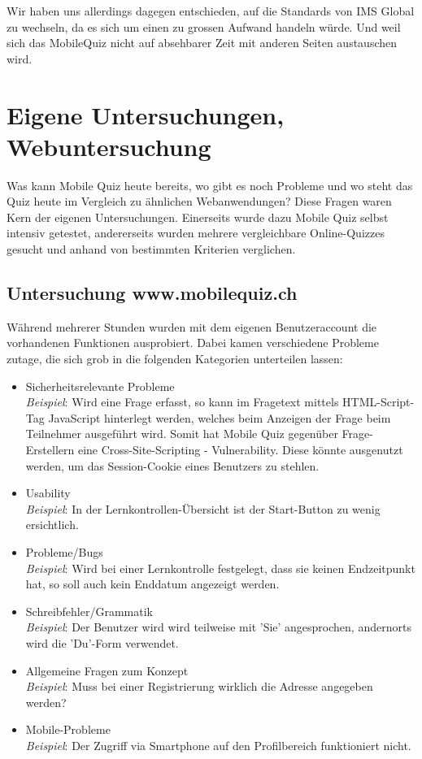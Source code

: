 Wir haben uns allerdings dagegen entschieden, auf die Standards von IMS Global zu wechseln, da es sich um einen zu grossen Aufwand handeln würde. Und weil sich das MobileQuiz nicht auf absehbarer Zeit mit anderen Seiten austauschen wird.


\section{Eigene Untersuchungen, Webuntersuchung}

Was kann Mobile Quiz heute bereits, wo gibt es noch Probleme und wo steht das Quiz heute im Vergleich zu ähnlichen Webanwendungen? Diese Fragen waren Kern der eigenen Untersuchungen. Einerseits wurde dazu Mobile Quiz selbst intensiv getestet, andererseits wurden mehrere vergleichbare Online-Quizzes gesucht und anhand von bestimmten Kriterien verglichen.


	\subsection{Untersuchung www.mobilequiz.ch}
	Während mehrerer Stunden wurden mit dem eigenen Benutzeraccount die vorhandenen Funktionen ausprobiert. Dabei kamen verschiedene Probleme zutage, die sich grob in die folgenden Kategorien unterteilen lassen:
	
	
	\begin{itemize}
		\item Sicherheitsrelevante Probleme \\
		\textit{Beispiel}: Wird eine Frage erfasst, so kann im Fragetext mittels HTML-Script-Tag JavaScript hinterlegt werden, welches beim Anzeigen der Frage beim Teilnehmer ausgeführt wird. Somit hat Mobile Quiz gegenüber Frage-Erstellern eine \gls{Cross-Site-Scripting} - \gls{Vulnerability}. Diese könnte ausgenutzt werden, um das Session-Cookie eines Benutzers zu stehlen.
		\item Usability \\
		\textit{Beispiel}: In der Lernkontrollen-Übersicht ist der Start-Button zu wenig ersichtlich.
		\item Probleme/Bugs \\
		\textit{Beispiel}: Wird bei einer Lernkontrolle festgelegt, dass sie keinen Endzeitpunkt hat, so soll auch kein Enddatum angezeigt werden.
		\item Schreibfehler/Grammatik \\
		\textit{Beispiel}: Der Benutzer wird wird teilweise mit 'Sie' angesprochen, andernorts wird die 'Du'-Form verwendet.
		\item Allgemeine Fragen zum Konzept \\
		\textit{Beispiel}: Muss bei einer Registrierung wirklich die Adresse angegeben werden?
		\item Mobile-Probleme \\
		\textit{Beispiel}: Der Zugriff via Smartphone auf den Profilbereich funktioniert nicht.
	\end{itemize}

